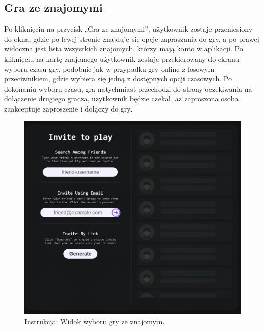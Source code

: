 \documentclass[12pt,a4paper]{article}
\begin{document}
\newpage

\subsection{Gra ze znajomymi}

Po kliknięciu na przycisk „Gra ze znajomymi”, użytkownik zostaje przeniesiony do okna, gdzie po lewej stronie znajduje się opcje zapraszania do gry, a po prawej widoczna jest lista wszystkich znajomych, którzy mają konto w aplikacji. Po kliknięciu na kartę znajomego użytkownik zostaje przekierowany do ekranu wyboru czasu gry, podobnie jak w przypadku gry online z losowym przeciwnikiem, gdzie wybiera się jedną z dostępnych opcji czasowych. Po dokonaniu wyboru czasu, gra natychmiast przechodzi do strony oczekiwania na dołączenie drugiego gracza, użytkownik będzie czekał, aż zaproszona osoba zaakceptuje zaproszenie i dołączy do gry.

\vspace{0.5cm}
\begin{figure}[h!]
    \centering
    \includegraphics[width=1\textwidth]{images/ins_min_pvf.png}
    \caption{Instrukcja: Widok wyboru gry ze znajomym.}
\end{figure}

\newpage
\end{document}
